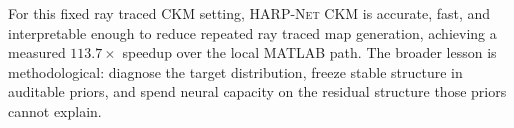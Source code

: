 \documentclass[journal]{IEEEtran}
\begin{document}
For this fixed ray traced CKM setting, \textsc{HARP-Net CKM} is accurate, fast,
and interpretable enough to reduce repeated ray traced map generation, achieving
a measured \(113.7\times\) speedup over the local MATLAB path. The broader
lesson is methodological: diagnose the target distribution, freeze stable
structure in auditable priors, and spend neural capacity on the residual
structure those priors cannot explain.



\end{document}
